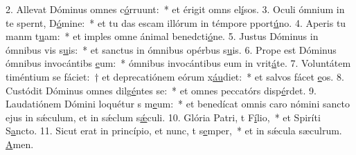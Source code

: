 2. Allevat Dóminus omnes  c\uline{ó}rruunt:~* et érigit omns el\uline{í}sos.
3. Oculi ómnium in te spernt, D\uline{ó}mine:~* et tu das escam illórum in témpore pport\uline{ú}no.
4. Aperis tu manm t\uline{u}am:~* et imples omne ánimal benedcti\uline{ó}ne.
5. Justus Dóminus in ómnibus vis s\uline{u}is:~* et sanctus in ómnibus opérbus s\uline{u}is.
6. Prope est Dóminus ómnibus invocántibs \uline{e}um:~* ómnibus invocántibus eum in vrit\uline{á}te.
7. Voluntátem timéntium se fáciet:~† et deprecatiónem eórum x\uline{áu}diet:~* et salvos fácet \uline{e}os.
8. Custódit Dóminus omnes dilg\uline{é}ntes se:~* et omnes peccatórs disp\uline{é}rdet.
9. Laudatiónem Dómini loquétur s m\uline{e}um:~* et benedícat omnis caro nómini sancto ejus in sǽculum, et in sǽclum s\uline{ǽ}culi.
10. Glória Patri, t F\uline{í}lio,~* et Spiríti S\uline{a}ncto.
11. Sicut erat in princípio, et nunc, t s\uline{e}mper,~* et in sǽcula sæculrum. \uline{A}men.
